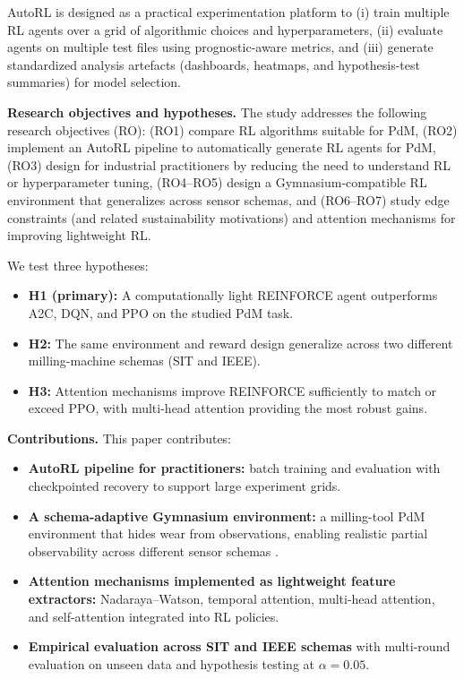 \documentclass[refree,sn-basic]{sn-jnl} %
\begin{document}
AutoRL is designed as a practical experimentation platform to (i) train multiple RL agents over a grid of algorithmic choices and hyperparameters, (ii) evaluate agents on multiple test files using prognostic-aware metrics, and (iii) generate standardized analysis artefacts (dashboards, heatmaps, and hypothesis-test summaries) for model selection.

\textbf{Research objectives and hypotheses.}
The study addresses the following research objectives (RO): (RO1) compare RL algorithms suitable for PdM, (RO2) implement an AutoRL pipeline to automatically generate RL agents for PdM, (RO3) design for industrial practitioners by reducing the need to understand RL or hyperparameter tuning, (RO4--RO5) design a Gymnasium-compatible RL environment that generalizes across sensor schemas, and (RO6--RO7) study edge constraints (and related sustainability motivations) and attention mechanisms for improving lightweight RL.

We test three hypotheses:
\begin{itemize}
        \item \textbf{H1 (primary):} A computationally light REINFORCE agent outperforms A2C, DQN, and PPO on the studied PdM task.
        \item \textbf{H2:} The same environment and reward design generalize across two different milling-machine schemas (SIT and IEEE).
        \item \textbf{H3:} Attention mechanisms improve REINFORCE sufficiently to match or exceed PPO, with multi-head attention providing the most robust gains.
\end{itemize}

\textbf{Contributions.}
This paper contributes:
\begin{itemize}
        \item \textbf{AutoRL pipeline for practitioners:} batch training and evaluation with checkpointed recovery to support large experiment grids.
        \item \textbf{A schema-adaptive Gymnasium environment:} a milling-tool PdM environment that hides wear from observations, enabling realistic partial observability across different sensor schemas \cite{Gymnasium2023}.
        \item \textbf{Attention mechanisms implemented as lightweight feature extractors:} Nadaraya--Watson, temporal attention, multi-head attention, and self-attention integrated into RL policies.
        \item \textbf{Empirical evaluation across SIT and IEEE schemas} with multi-round evaluation on unseen data and hypothesis testing at $\alpha=0.05$.
\end{itemize}
\end{document}
